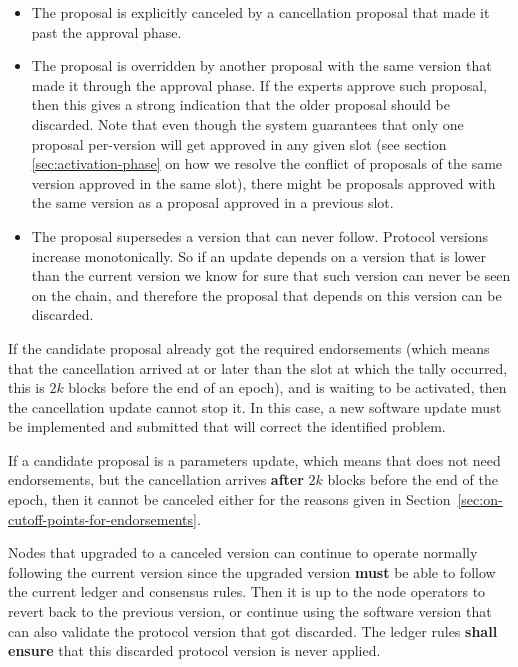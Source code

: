 \begin{itemize}
\item The proposal is explicitly canceled by a cancellation proposal that made
  it past the approval phase.
\item The proposal is overridden by another proposal with the same version that
  made it through the approval phase. If the experts approve such proposal, then
  this gives a strong indication that the older proposal should be discarded.
  Note that even though the system guarantees that only one proposal per-version
  will get approved in any given slot (see section \ref{sec:activation-phase} 
  on how we resolve the conflict of proposals of the same version approved in 
  the same slot), 
  there might be proposals approved with
  the same version as a proposal approved in a previous slot.
\item The proposal supersedes a version that can never follow. Protocol versions
  increase monotonically. So if an update depends on a version that is lower
  than the current version we know for sure that such version can never be seen
  on the chain, and therefore the proposal that depends on this version can be
  discarded.
\end{itemize}

If the candidate proposal already got the required endorsements (which means
that the cancellation arrived at or later than the slot at which the tally
occurred, this is $2k$ blocks before the end of an epoch), and is waiting to
be activated, then the cancellation update cannot stop it. In this case, a new
software update must be implemented and submitted that will correct the
identified problem.

If a candidate proposal is a parameters update, which means that does not need
endorsements, but the cancellation arrives \textbf{after} $2k$ blocks before
the end of the epoch, then it cannot be canceled either for the reasons given in
Section~\ref{sec:on-cutoff-points-for-endorsements}.

Nodes that upgraded to a canceled version can continue to operate normally
following the current version since the upgraded version \textbf{must} be able
to follow the current ledger and consensus rules.
%
Then it is up to the node operators to revert back to the previous version, or
continue using the software version that can also validate the protocol version
that got discarded. The ledger rules \textbf{shall ensure} that this discarded
protocol version is never applied.

